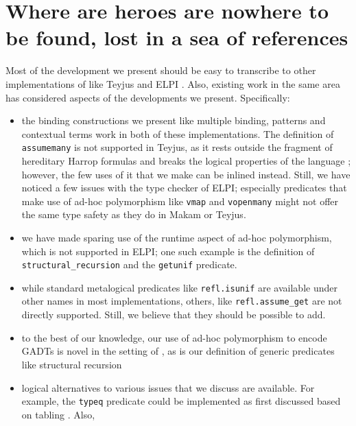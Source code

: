 \section{Where are heroes are nowhere to be found, lost in a sea of
references}\label{where-are-heroes-are-nowhere-to-be-found-lost-in-a-sea-of-references}

\identNormal

 Most of the development we
present should be easy to transcribe to other implementations of
\lamprolog like Teyjus \citep{teyjus-main-reference} and ELPI
\citep{elpi-main-reference}. Also, existing work in the same area has
considered aspects of the developments we present. Specifically:

\begin{itemize}
\tightlist
\item
  the binding constructions we present like multiple binding, patterns
  and contextual terms work in both of these implementations. The
  definition of \texttt{assumemany} is not supported in Teyjus, as it
  rests outside the fragment of hereditary Harrop formulas and breaks
  the logical properties of the language \citep{assumemany-issue};
  however, the few uses of it that we make can be inlined instead.
  Still, we have noticed a few issues with the type checker of ELPI;
  especially predicates that make use of ad-hoc polymorphism like
  \texttt{vmap} and \texttt{vopenmany} might not offer the same type
  safety as they do in Makam or Teyjus.
\item
  we have made sparing use of the runtime aspect of ad-hoc polymorphism,
  which is not supported in ELPI; one such example is the definition of
  \texttt{structural\_recursion} and the \texttt{getunif} predicate.
\item
  while standard metalogical predicates like \texttt{refl.isunif} are
  available under other names in most \lamprolog implementations,
  others, like \texttt{refl.assume\_get} are not directly supported.
  Still, we believe that they should be possible to add.
\item
  to the best of our knowledge, our use of ad-hoc polymorphism to encode
  GADTs is novel in the setting of \lamprolog, as is our definition of
  generic predicates like structural recursion
\item
  logical alternatives to various issues that we discuss are available.
  For example, the \texttt{typeq} predicate could be implemented as
  first discussed based on tabling \citep{tabling-main-reference}. Also,

\end{itemize}
